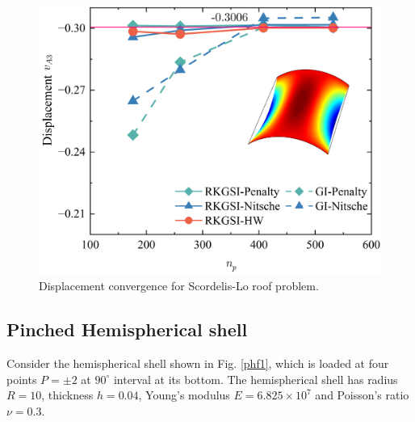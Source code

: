\begin{figure}[!ht]
\centering
\DIFdelbeginFL %
\DIFdelendFL \DIFaddbeginFL \includegraphics[width=\textwidth]{figures/sld_r2}
\DIFaddendFL \caption{Displacement convergence for Scordelis-Lo roof problem.}\label{slf4}
\end{figure}

\subsection{Pinched Hemispherical shell}
Consider the hemispherical shell shown in Fig. \ref{phf1}, which is loaded at four points $P=\pm 2$ at $90^\circ$ interval at its bottom. The hemispherical shell has \DIFdelbegin {}\DIFdelend \DIFaddbegin {}\DIFaddend radius $R=10$, thickness $h=0.04$, Young's modulus $E=6.825\times10^7$ and Poisson's ratio $\nu = 0.3$.

